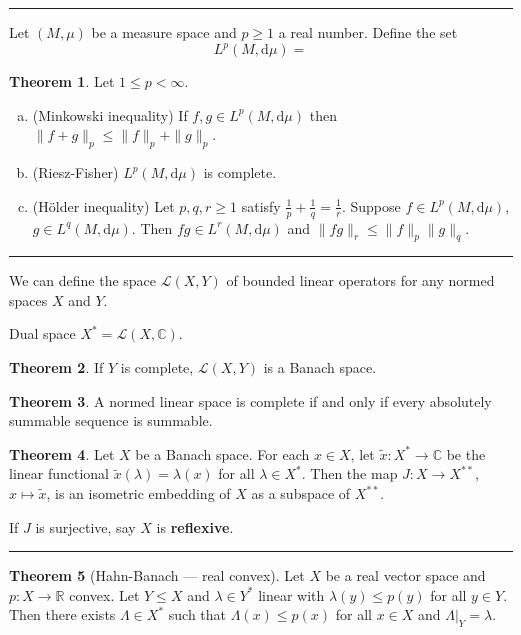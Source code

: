 \documentclass[12pt]{article}
\newcommand{\keyword}[1]{\textbf{#1}}
\newcommand{\sepline}{\rule{\textwidth}{0.4pt}}
\theoremstyle{definition}
\newtheorem{theorem}{Theorem}
\newcommand{\R}{\mathbb{R}}
\newcommand{\C}{\mathbb{C}}
\newcommand{\LL}{\mathcal{L}}
\newcommand{\<}{\left\langle}
\renewcommand{\>}{\right\rangle}
\newcommand{\dd}{\mathrm{d}}
\begin{document}
\sepline

Let $(M, \mu)$ be a measure space and $p \geq 1$ a real number.
Define the set
\[
    L^p(M, \dd{\mu}) = 
\]

\begin{theorem}
    Let $1 \leq p < \infty$.
    \begin{enumerate}[(a)]
        \item (Minkowski inequality) If $f, g \in L^p(M, \dd\mu)$ then $\|f + g\|_p \leq \|f\|_p + \|g\|_p$.
        \item (Riesz-Fisher) $L^p(M, \dd\mu)$ is complete.
        \item (H\"older inequality) Let $p, q, r \geq 1$ satisfy $\frac{1}{p} + \frac{1}{q} = \frac{1}{r}$.
        Suppose $f \in L^p(M, \dd\mu)$, $g \in L^q(M, \dd\mu)$.
        Then $fg \in L^r(M, \dd\mu)$ and $\|fg\|_r \leq \|f\|_p \|g\|_q$.
    \end{enumerate}
\end{theorem}

\sepline

We can define the space $\LL(X, Y)$ of bounded linear operators for any normed spaces $X$ and $Y$.

Dual space $X^* = \LL(X, \C)$.

\begin{theorem}
    If $Y$ is complete, $\LL(X, Y)$ is a Banach space.
\end{theorem}

\begin{theorem}
    A normed linear space is complete if and only if every absolutely summable sequence is summable.
\end{theorem}

\begin{theorem}
    Let $X$ be a Banach space.
    For each $x \in X$, let $\tilde{x} : X^* \to \C$ be the linear functional $\tilde{x}(\lambda) = \lambda(x)$ for all $\lambda \in X^*$.
    Then the map $J : X \to X^{**}$, $x \mapsto \tilde{x}$, is an isometric embedding of $X$ as a subspace of $X^{**}$.
\end{theorem}

If $J$ is surjective, say $X$ is \keyword{reflexive}.

\sepline

\begin{theorem}[Hahn-Banach --- real convex]
    Let $X$ be a real vector space and $p : X \to \R$ convex.
    Let $Y \leq X$ and $\lambda \in Y^*$ linear with $\lambda(y) \leq p(y)$ for all $y \in Y$.
    Then there exists $\Lambda \in X^*$ such that $\Lambda(x) \leq p(x)$ for all $x \in X$ and $\Lambda|_Y = \lambda$.
\end{theorem}
\end{document}
